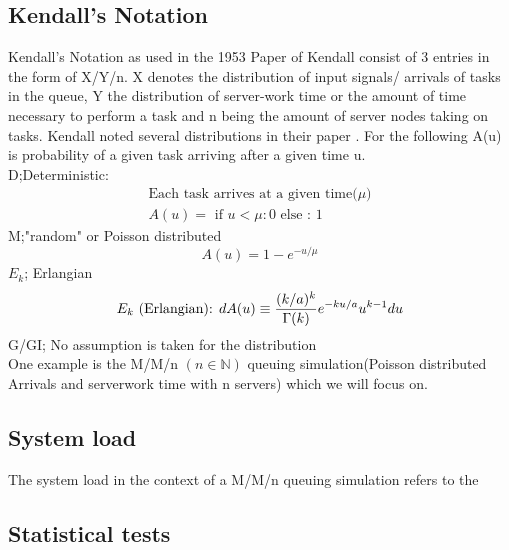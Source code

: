 \documentclass{uva-inf-article}
\begin{document}
    \subsection{Kendall's Notation}
    Kendall's Notation as used in the 1953 Paper of Kendall\parencite{Kendall1953} consist of 3 entries in the form of X/Y/n.
    X denotes the distribution of input signals/ arrivals of tasks in the queue, Y the distribution of 
    server-work time or the amount of time necessary to perform a task and n being the amount of server nodes 
    taking on tasks.
    Kendall noted several distributions in their paper\parencite{Kendall1953} .
    For the following A(u) is probability of a given task arriving after a given time u.\\
    D;Deterministic:
\begin{equation}\label{eq:determ}
	\begin{split}
		\text {Each task arrives at a given time($\mu$)}\\
        A(u) = \text { if  }u<\mu : 0 \text{ else : } 1
    \end{split}
	\end{equation}
    M;"random" or Poisson distributed
    \begin{equation}\label{eq:poisson}
    A(u) = 1-e^{-u/\mu}
	\end{equation}
    $E_k$; Erlangian
    \begin{equation}\label{eq:erlang}
        E_k \text { (Erlangian): } d A(u) \equiv \frac{(k / a)^k}{\Gamma(k)} e^{-k u / a} u^{k-1} d u\\
	\end{equation}
    G/GI; No assumption is taken for the distribution\\
    
    One example is the M/M/n $(n \in \mathbb{N})$ queuing simulation(Poisson distributed Arrivals and serverwork time with n servers) which we will focus on.



\subsection{System load}
The system load in the context of a M/M/n queuing simulation refers to the 

\subsection{Statistical tests}
\end{document}
